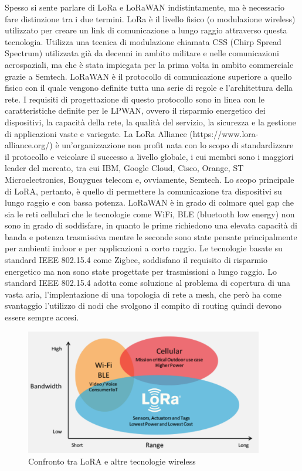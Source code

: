 \documentclass[12pt,a4paper,openright,twoside]{report}
\begin{document}
Spesso si sente parlare di LoRa e LoRaWAN indistintamente, ma \`e necessario fare distinzione tra i due termini.
LoRa \`e il livello fisico (o modulazione wireless) utilizzato per creare un link di comunicazione a lungo raggio attraverso questa tecnologia. Utilizza una tecnica di modulazione chiamata CSS (Chirp Spread Spectrum) utilizzata gi\`a da decenni in ambito militare e nelle comunicazioni aerospaziali, ma che \`e stata impiegata per la prima volta in ambito commerciale grazie a Semtech. 
LoRaWAN \`e il protocollo di comunicazione superiore a quello fisico con il quale vengono definite tutta una serie di regole e l'architettura della rete. I requisiti di progettazione di questo protocollo sono in linea con le caratteristiche definite per le LPWAN, ovvero il risparmio energetico dei dispositivi, la capacit\`a della rete, la qualit\`a del servizio, la sicurezza e la gestione di applicazioni vaste e variegate. 
La LoRa Alliance (https://www.lora-alliance.org/) \`e un'organizzazione non profit nata con lo scopo di standardizzare il protocollo e veicolare il successo a livello globale, i cui membri sono i maggiori leader del mercato, tra cui IBM, Google Cloud, Cisco, Orange, ST Microelectronics, Bouygues telecom e, ovviamente, Semtech.    
Lo scopo principale di LoRA, pertanto, \`e quello di permettere la comunicazione tra dispositivi su lungo raggio e con bassa potenza. LoRaWAN \`e in grado di colmare quel gap che sia le reti cellulari che le tecnologie come WiFi, BLE (bluetooth low energy) non sono in grado di soddisfare, in quanto le prime richiedono una elevata capacit\`a di banda e potenza trasmissiva mentre le seconde sono state pensate principalmente per ambienti indoor e per applicazioni a corto raggio. Le tecnologie basate su standard IEEE 802.15.4 come Zigbee, soddisfano il requisito di risparmio energetico ma non sono state progettate per trasmissioni a lungo raggio. Lo standard IEEE 802.15.4 adotta come soluzione al problema di copertura di una vasta aria, l'implentazione di una topologia di rete a mesh, che per\`o ha come svantaggio l'utilizzo di nodi che svolgono il compito di routing quindi devono essere sempre accesi.
\begin{figure}[h]                      
\begin{center} 
\includegraphics[width=\textwidth,height=55mm]{Lora_technology_gap.png}
\caption[Confronto tra LoRA e altre tecnologie wireless]{Confronto tra LoRA e altre tecnologie wireless}\label{fig:undicesima}
\end{center}
\end{figure}
\end{document}
